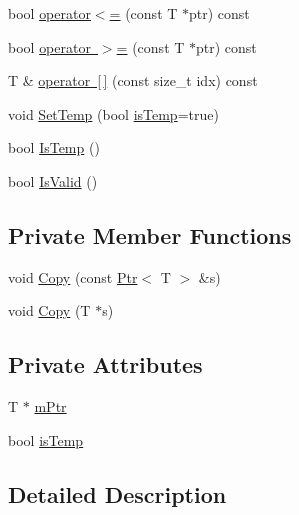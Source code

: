 \begin{DoxyCompactItemize}
\item 
bool \mbox{\hyperlink{classpdl_1_1memory_1_1_ptr_ad4e56a4fe4e50ee0c021f26b819bf27f}{operator$<$=}} (const T $\ast$ptr) const
\item 
bool \mbox{\hyperlink{classpdl_1_1memory_1_1_ptr_a2141750a87109f05d527206d9c254b68}{operator $>$=}} (const T $\ast$ptr) const
\item 
T \& \mbox{\hyperlink{classpdl_1_1memory_1_1_ptr_ae387832a8135f341f737d2f5c3b048de}{operator \mbox{[}$\,$\mbox{]}}} (const size\+\_\+t idx) const
\item 
void \mbox{\hyperlink{classpdl_1_1memory_1_1_ptr_abe6978378457cb9ba0666abae0fab03c}{Set\+Temp}} (bool \mbox{\hyperlink{classpdl_1_1memory_1_1_ptr_ac66f80e55b55014adb1c843a2417c96c}{is\+Temp}}=true)
\item 
bool \mbox{\hyperlink{classpdl_1_1memory_1_1_ptr_a233cd93ac140c03522e16e04ab39a594}{Is\+Temp}} ()
\item 
bool \mbox{\hyperlink{classpdl_1_1memory_1_1_ptr_a433c57dccff8f62a495375a6dd8d3047}{Is\+Valid}} ()
\end{DoxyCompactItemize}
\subsection*{Private Member Functions}
\begin{DoxyCompactItemize}
\item 
void \mbox{\hyperlink{classpdl_1_1memory_1_1_ptr_ae7b728e622aad32d63790c3068fd0256}{Copy}} (const \mbox{\hyperlink{classpdl_1_1memory_1_1_ptr}{Ptr}}$<$ T $>$ \&s)
\item 
void \mbox{\hyperlink{classpdl_1_1memory_1_1_ptr_aac3ff76000db96c0e916a51710524823}{Copy}} (T $\ast$s)
\end{DoxyCompactItemize}
\subsection*{Private Attributes}
\begin{DoxyCompactItemize}
\item 
T $\ast$ \mbox{\hyperlink{classpdl_1_1memory_1_1_ptr_a0e3ce5a9d122b322ac2b6f24767bbbd5}{m\+Ptr}}
\item 
bool \mbox{\hyperlink{classpdl_1_1memory_1_1_ptr_ac66f80e55b55014adb1c843a2417c96c}{is\+Temp}}
\end{DoxyCompactItemize}


\subsection{Detailed Description}
